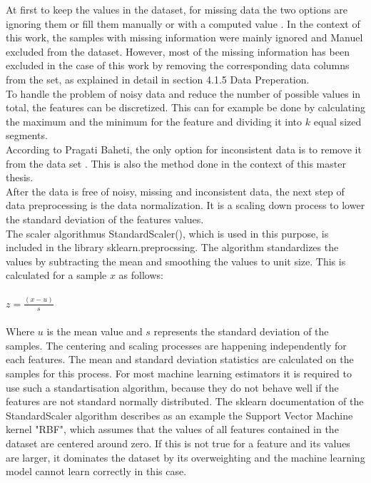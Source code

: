 \documentclass[../masterarbeit.tex]{subfiles}
\begin{document}
At first to keep the values in the dataset, for missing data the two options are ignoring them or fill them manually or with a computed value \textcite[]{Pragati_Preprocessing:2022} \textcite[]{kotsiantis2006data}. In the context of this work, the samples with missing information were mainly ignored and Manuel excluded from the dataset. However, most of the missing information has been excluded in the case of this work by removing the corresponding data columns from the set, as explained in detail in section 4.1.5 Data Preperation. \\
To handle the problem of noisy data and reduce the number of possible values in total, the features can be discretized. This can for example be done by calculating the maximum and the minimum for the feature and dividing it into \(k\) equal sized segments. \autocite[]{kotsiantis2006data} \\
According to Pragati Baheti, the only option for inconsistent data is to remove it from the data set \textcite[]{Pragati_Preprocessing:2022}. This is also the method done in the context of this master thesis. \\
After the data is free of noisy, missing and inconsistent data, the next step of data preprocessing is the data normalization. It is a scaling down process to lower the standard deviation of the features values. \autocite[]{kotsiantis2006data} \\
The scaler algorithmus StandardScaler(), which is used in this purpose, is included in the library sklearn.preprocssing. The algorithm standardizes the values by subtracting the mean and smoothing the values to unit size. \autocite[]{Sklearn_StandardScaler:2022} This is calculated for a sample \(x\) as follows:
\\~\\
\(z = \frac{(x - u)}{s} \) \hfill \textcite[]{Sklearn_StandardScaler:2022} \\~\\
Where \(u\) is the mean value and \(s\) represents the standard deviation of the samples. The centering and scaling processes are happening independently for each features. The mean and standard deviation statistics are calculated on the samples  for this process. \autocite[]{Sklearn_StandardScaler:2022}
For most machine learning estimators it is required to use such a standartisation algorithm, because they do not behave well if the features are not standard normally distributed. \autocite[]{Sklearn_StandardScaler:2022}
The sklearn documentation of the StandardScaler algorithm describes as an example the Support Vector Machine kernel "RBF", which assumes that the values of all features contained in the dataset are centered around zero. If this is not true for a feature and its values are larger, it dominates the dataset by its overweighting and the machine learning model cannot learn correctly in this case. \autocite[]{Sklearn_StandardScaler:2022}
\end{document}
